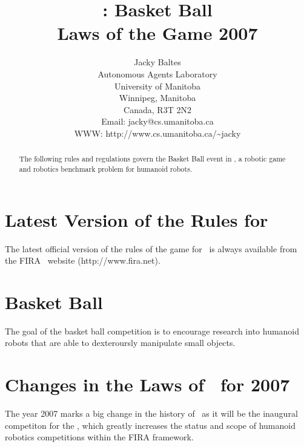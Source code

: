 \documentclass[12pt]{hurocup}
\begin{document}
\title{\HuroCup: Basket Ball\\
  Laws of the Game 2007}


\author{Jacky Baltes\\
Autonomous Agents Laboratory\\
University of Manitoba\\
Winnipeg, Manitoba\\
Canada, R3T 2N2\\
Email: jacky@cs.umanitoba.ca\\
WWW: http://www.cs.umanitoba.ca/\~{ }jacky
}

\maketitle


\begin{abstract}
The following rules and regulations govern the Basket Ball event in
\HuroCup, a robotic game and robotics benchmark problem for humanoid
robots.
%
\end{abstract}

\section*{Latest Version of the Rules for \HuroCup}
\label{sec:updates}

The latest official version of the rules of the game for \HuroCup\ is
always available from the FIRA \HuroCup\ website (http://www.fira.net).

\newpage

\section{Basket Ball}
\label{sec:basket-ball} 

The goal of the basket ball competition is to encourage research into
humanoid robots that are able to dexteroursly manipulate small
objects.

\section{Changes in the Laws of \HuroCup\ for 2007}

The year 2007 marks a big change in the history of \HuroCup\ as it will
be the inaugural competiton for the \HuroCup, which greatly increases
the status and scope of humanoid robotics competitions within the FIRA
framework.
\end{document}
